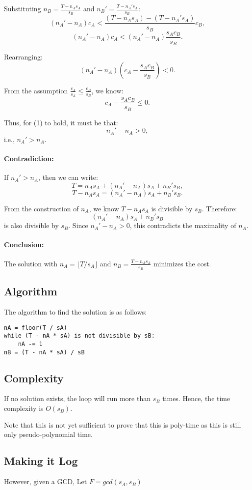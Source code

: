 \documentclass{article}
\begin{document}
Substituting $n_B = \frac{T - n_A s_A}{s_B}$ and $n_B' = \frac{T - n_A' s_A}{s_B}$:
\[
(n_A' - n_A) c_A < \frac{(T - n_A s_A) - (T - n_A' s_A)}{s_B} c_B,
\]
\[
(n_A' - n_A) c_A < (n_A' - n_A) \frac{s_A c_B}{s_B}.
\]

Rearranging:
\[
(n_A' - n_A) \left( c_A - \frac{s_A c_B}{s_B} \right) < 0. \tag{1}
\]

From the assumption $\frac{c_A}{s_A} \leq \frac{c_B}{s_B}$, we know:
\[
c_A - \frac{s_A c_B}{s_B} \leq 0.
\]

Thus, for (1) to hold, it must be that:
\[
n_A' - n_A > 0,
\]
i.e., $n_A' > n_A$.

\paragraph{Contradiction:}
If $n_A' > n_A$, then we can write:
\[
T = n_A s_A + (n_A' - n_A) s_A + n_B' s_B,
\]
\[
T - n_A s_A = (n_A' - n_A) s_A + n_B' s_B.
\]

From the construction of $n_A$, we know $T - n_A s_A$ is divisible by $s_B$. Therefore:
\[
(n_A' - n_A) s_A + n_B' s_B
\]
is also divisible by $s_B$. Since $n_A' - n_A > 0$, this contradicts the maximality of $n_A$.

\paragraph{Conclusion:}
The solution with $n_A = \lfloor T / s_A \rfloor$ and $n_B = \frac{T - n_A s_A}{s_B}$ minimizes the cost.

\subsection*{Algorithm}
The algorithm to find the solution is as follows:
\begin{verbatim}
nA = floor(T / sA)
while (T - nA * sA) is not divisible by sB:
    nA -= 1
nB = (T - nA * sA) / sB
\end{verbatim}

\subsection*{Complexity}
If no solution exists, the loop will run more than $s_B$ times. Hence, the time complexity is $O(s_B)$.

Note that this is not yet sufficient to prove that this is poly-time as this is still only
pseudo-polynomial time. 

\subsection*{Making it Log}
However, given a GCD,
Let $F = gcd(s_A,s_B)$
\end{document}
